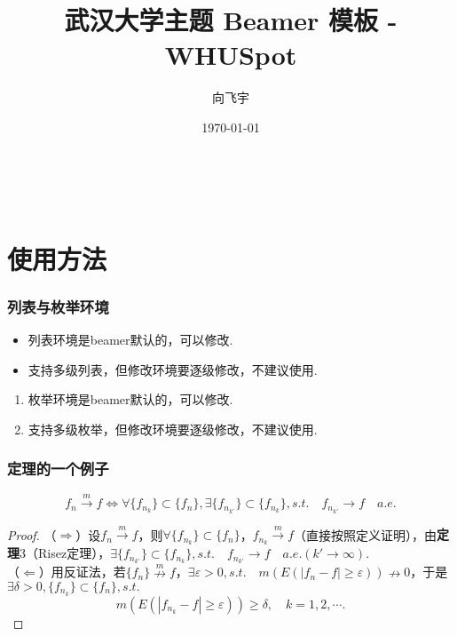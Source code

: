 \documentclass{beamer}
\title{武汉大学主题 Beamer 模板 - WHUSpot}
\author{向飞宇}
\institute{武汉大学}
\date{\today}
\begin{document}
\begin{frame}
    \frametitle{\\}
    \titlepage
\end{frame}

\section{使用方法}

\begin{frame}
    \frametitle{列表与枚举环境}
    \begin{itemize}
        \item 列表环境是beamer默认的，可以修改. \pause
        \item 支持多级列表，但修改环境要逐级修改，\alert{不建议}使用. \pause
    \end{itemize}

    \begin{enumerate}
        \item 枚举环境是beamer默认的，可以修改. \pause
        \item 支持多级枚举，但修改环境要逐级修改，\alert{不建议}使用.
    \end{enumerate}
\end{frame}

\begin{frame}
    \frametitle{定理的一个例子}
    \begin{theorem}[Risez定理的一个应用]
    \begin{equation*}
        f_n \stackrel{m}{\longrightarrow} f \Leftrightarrow \forall \{f_{n_k}\} \subset \{f_n\}, \exists \{f_{n_{k'}}\} \subset \{f_{n_k}\}, s.t. \quad f_{n_{k'}} \to f \quad a.e.     
    \end{equation*}
    \end{theorem}
    \renewcommand{\qedsymbol}{}
    \begin{proof}
        （$\Rightarrow$）设$f_n \stackrel{m}{\longrightarrow}f$，则$\forall \{f_{n_k}\} \subset \{f_n\}$，$f_{n_k} \stackrel{m}{\longrightarrow} f$（直接按照定义证明），由\textbf{定理$3$}（Risez定理），$\exists \{f_{n_{k'}}\} \subset \{f_{n_k}\}, s.t. \quad f_{n_{k'}} \to f \quad a.e. (k' \to \infty).$ \\
        （$\Leftarrow$）用反证法，若$\{f_n\} \stackrel{m}{\nrightarrow} f$，$\exists \varepsilon > 0, s.t. \quad m(E(|f_n - f| \geqslant \varepsilon)) \nrightarrow 0$，于是$\exists \delta > 0, \{f_{n_k}\} \subset \{f_n\}, s.t.$ \[m(E(|f_{n_k} - f| \geqslant \varepsilon)) \geqslant \delta, \quad k = 1, 2, \cdots.\] 
    \end{proof}
\end{frame}
\end{document}
